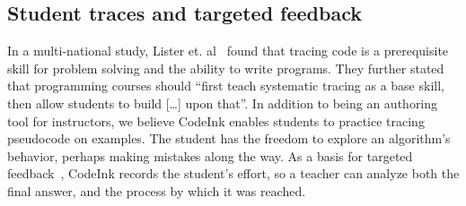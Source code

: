 \subsection{Student traces and targeted feedback}
In a multi-national study, Lister et. al~\cite{Lister2004} found that tracing
code is a prerequisite skill for problem solving and the ability to write
programs. They further stated that programming courses should ``first teach
systematic tracing as a base skill, then allow students to build [\ldots] upon
that''.
In addition to being an authoring tool for instructors, we believe CodeInk
enables students to practice tracing pseudocode on examples. The student has the
freedom to explore an algorithm's behavior, perhaps making mistakes along the
way. As a basis for targeted feedback~\cite{Balzer1989}, CodeInk records the
student's effort, so a teacher can analyze both the final answer, and the
process by which it was reached.


